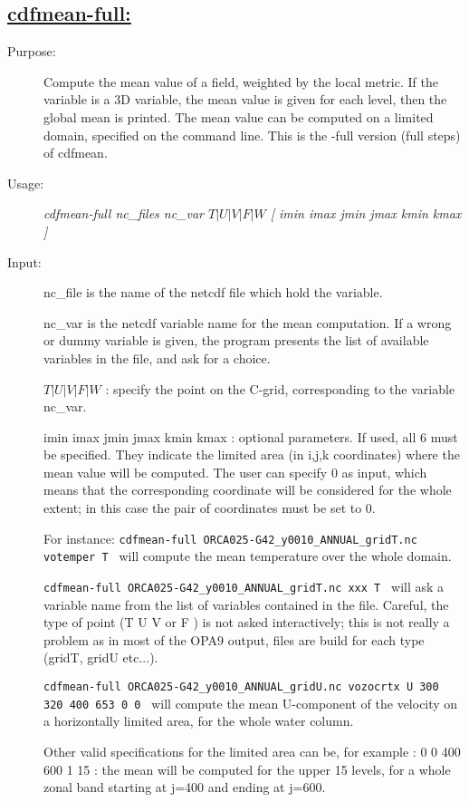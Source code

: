 \documentclass[a4paper,11pt]{article}
\begin{document}
\subsection*{\underline{cdfmean-full:}}
\begin{description}
\item[Purpose:] Compute the mean value of a field, weighted by the local metric. If the variable is a 3D variable,
the mean value is given for each level, then the global mean is printed. The mean value can be computed on a limited
domain, specified on the command line. This is the -full version (full steps) of cdfmean.
\item[Usage:] {\em cdfmean-full nc\_files nc\_var  $T | U | V | F | W$ [ imin imax jmin jmax kmin kmax ] }
\item[Input:] nc\_file is the name of the netcdf file which hold the variable. 

nc\_var is the netcdf variable name for the mean computation. If a wrong or dummy variable is given, the program
presents the list of available variables in the file, and ask for a choice.

$ T | U | V | F | W $ : specify the point on the C-grid, corresponding to the variable nc\_var.

imin imax jmin jmax  kmin kmax : optional parameters. If used, all 6 must be specified. They indicate the limited
area (in i,j,k coordinates) where the mean value will be computed. The user can specify 0 as input, which means that
the corresponding coordinate will be considered for the whole extent; in this case the pair of coordinates must be set 
to 0. 

For instance: {\tt cdfmean-full  ORCA025-G42\_y0010\_ANNUAL\_gridT.nc votemper T } will compute the mean temperature over
the whole domain.

 {\tt cdfmean-full  ORCA025-G42\_y0010\_ANNUAL\_gridT.nc xxx T } will ask a variable name from the list of variables contained
in the file. Careful, the type of point (T U V or F ) is not asked interactively; this is not really a problem as in most
of the OPA9 output, files are build for each type (gridT, gridU etc...).

 {\tt cdfmean-full  ORCA025-G42\_y0010\_ANNUAL\_gridU.nc vozocrtx U  300 320 400 653 0 0 } will compute the mean U-component
of the velocity on a horizontally limited area, for the whole water column. 

 Other valid specifications for the limited area 
can be, for example : 0 0  400 600 1 15 : the mean will be computed for the upper 15 levels, for a whole zonal band starting
at j=400 and ending at j=600.


\end{description}
\end{document}
